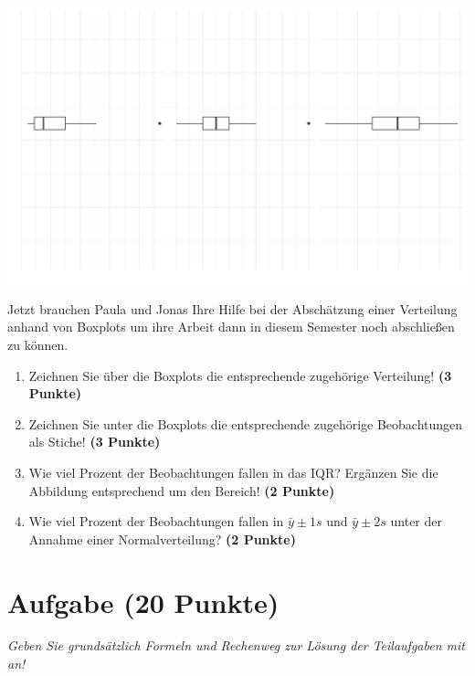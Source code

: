 \documentclass[a4paper, 9pt]{scrartcl}\usepackage[]{graphicx}\usepackage[]{xcolor}
\makeatletter
\def\maxwidth{ %
  \ifdim\Gin@nat@width>\linewidth
    \linewidth
  \else
    \Gin@nat@width
  \fi
}
\makeatother
\begin{document}
{\centering \includegraphics[width=\maxwidth]{img/desc-stat-11-1} 

}




Jetzt brauchen Paula und Jonas Ihre Hilfe bei der Abschätzung einer Verteilung anhand von Boxplots um ihre Arbeit dann in diesem Semester noch abschließen zu können.

\begin{enumerate}
\item Zeichnen Sie über die Boxplots die entsprechende zugehörige Verteilung! \textbf{(3 Punkte)} 
\item Zeichnen Sie unter die Boxplots die entsprechende zugehörige Beobachtungen als Stiche! \textbf{(3 Punkte)}
\item Wie viel Prozent der Beobachtungen fallen in das IQR? Ergänzen Sie die Abbildung entsprechend um den Bereich! \textbf{(2 Punkte)}
\item Wie viel Prozent der Beobachtungen fallen in $\bar{y} \pm 1s$ und $\bar{y} \pm 2s$  unter der Annahme einer Normalverteilung? \textbf{(2 Punkte)}
\end{enumerate} 
\clearpage

\section{Aufgabe \hfill (20 Punkte)}

\textit{Geben Sie grundsätzlich Formeln und Rechenweg zur Lösung der Teilaufgaben mit an!} \\[1Ex]
 
\end{document}
